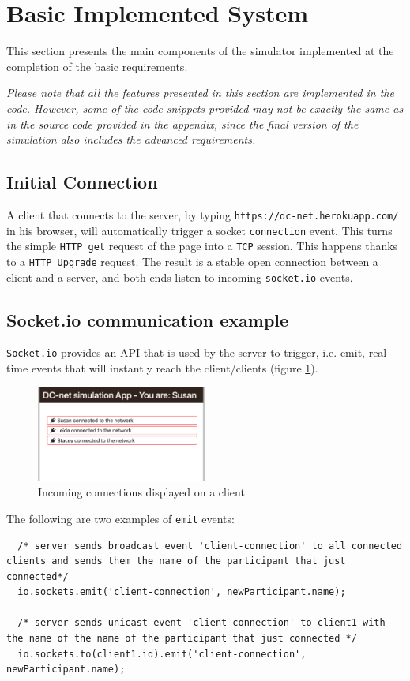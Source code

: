 \section{Basic Implemented System}
This section presents the main components of the simulator implemented at the completion of the basic requirements. 

\emph{Please note that all the features presented in this section are implemented in the code. However, some of the code snippets provided may not be exactly the same as in the source code provided in the appendix, since the final version of the simulation also includes the advanced requirements.}

\subsection{Initial Connection} \label{sec:initialConnection}
A client that connects to the server, by typing \lstinline{https://dc-net.herokuapp.com/} in his browser, will automatically trigger a socket \lstinline{connection} event. This turns the simple \lstinline{HTTP get} request of the page into a \lstinline{TCP} session. This happens thanks to a \lstinline{HTTP Upgrade} request. The result is a stable open connection between a client and a server, and both ends listen to incoming \lstinline{socket.io} events.


\subsection{Socket.io communication example}
\lstinline{Socket.io} provides an API that is used by the server to trigger, i.e. emit, real-time events that will instantly reach the client/clients (figure \ref{fig:incomingConnection}). 

\begin{figure}[H]
    \centering
    \includegraphics[width=0.5\textwidth]{Images/Implementation/incomingConnections.png}
    \caption{Incoming connections displayed on a client}
    \label{fig:incomingConnection}
\end{figure}

The following are two examples of \lstinline{emit} events: 
\begin{lstlisting}
  /* server sends broadcast event 'client-connection' to all connected clients and sends them the name of the participant that just connected*/
  io.sockets.emit('client-connection', newParticipant.name);
  
  /* server sends unicast event 'client-connection' to client1 with the name of the name of the participant that just connected */
  io.sockets.to(client1.id).emit('client-connection', newParticipant.name);
\end{lstlisting}

